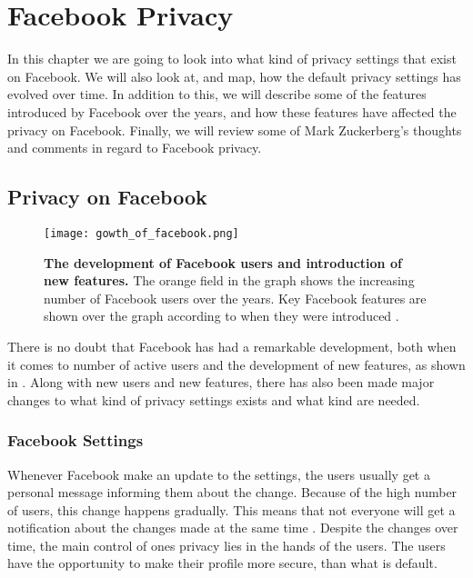 \chapter{Facebook Privacy}
\label{chp:defaultprivacysettings} 

In this chapter we are going to look into what kind of privacy settings that exist on Facebook. We will also look at, and map, how the default privacy settings has evolved over time. In addition to this, we will describe some of the features introduced by Facebook over the years, and how these features have affected the privacy on Facebook. Finally, we will review some of Mark Zuckerberg's  thoughts and comments in regard to Facebook privacy. 


\section{Privacy on Facebook}\label{sec:privacy_on_facebook}

\begin{figure}[b]
\centering
\texttt{[image: gowth\_of\_facebook.png]}
\caption[The development of Facebook users and introduction of new features]{\textbf{The development of Facebook users and introduction of new features.} The orange field in the graph shows the increasing number of Facebook users over the years. Key Facebook features are shown over the graph according to when they were introduced \cite{BBCFacebookGrowth}.} 
\label{fig:growth_of_facebook}
\end{figure}

There is no doubt that Facebook has had a remarkable development, both when it comes to number of active users and the development of new features, as shown in . Along with new users and new features, there has also been made major changes to what kind of privacy settings exists and what kind are needed. 


\subsection{Facebook Settings}
Whenever Facebook make an update to the settings, the users usually get a personal message informing them about the change. Because of the high number of users, this change happens gradually. This means that not everyone will get a notification about the changes made at the same time \cite{settingschangingagain}. Despite the changes over time, the main control of ones privacy lies in the hands of the users. The users have the opportunity to make their profile more secure, than what is default. 

